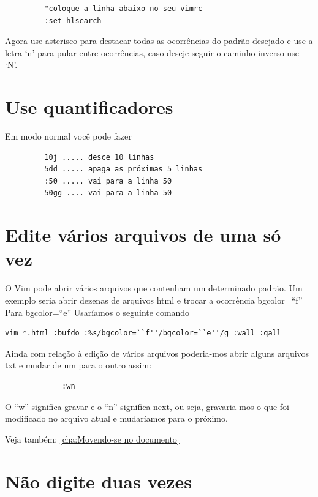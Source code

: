\documentclass[10pt,a4paper,openany]{book}
\begin{document}
\begin{verbatim}
		 "coloque a linha abaixo no seu vimrc
		 :set hlsearch
\end{verbatim}

Agora use asterisco para destacar todas as ocorrências do padrão desejado
e use a letra `n' para pular entre ocorrências, caso deseje seguir o caminho
inverso use `N'.

\section{Use quantificadores}
\label{Use quantificadores}
Em modo normal você pode fazer

\begin{verbatim}
		 10j ..... desce 10 linhas
		 5dd ..... apaga as próximas 5 linhas
		 :50 ..... vai para a linha 50
		 50gg .... vai para a linha 50
\end{verbatim}


\section{Edite vários arquivos de uma só vez }
\label{Edite vários arquivos de uma só vez }

O Vim pode abrir vários arquivos que contenham um determinado padrão.
Um exemplo seria abrir dezenas de arquivos html e trocar a ocorrência
bgcolor=``f'' Para bgcolor=``e'' Usaríamos o seguinte comando

\begin{verbatim}
vim *.html :bufdo :%s/bgcolor=``f''/bgcolor=``e''/g :wall :qall
\end{verbatim}

Ainda com relação à edição de vários arquivos poderia-mos abrir alguns
arquivos txt e mudar de um para o outro assim:

\begin{verbatim}
			 :wn
\end{verbatim}

O ``w'' significa gravar e o ``n'' significa next, ou seja, gravaria-mos
o que foi modificado no arquivo atual e mudaríamos para o próximo.

Veja também: \ref{cha:Movendo-se no documento}

\section{Não digite duas vezes}
\label{Não digite duas vezes}
\end{document}
